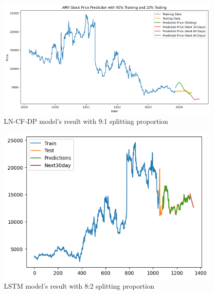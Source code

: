 \documentclass{ieeeojies}
\begin{document}
\begin{figure}[H]
  \centering
  \begin{minipage}{0.8\linewidth}
    \centering
    \includegraphics[width=\linewidth]{bibliography/Figure/AMV_LN_CF&DP.png}
    \caption{LN-CF-DP model's result with 9:1 splitting proportion}
    \label{fig8}
  \end{minipage}
\end{figure}

\begin{figure}[H]
  \centering
  \begin{minipage}{0.8\linewidth}
    \centering
    \includegraphics[width=\linewidth]{bibliography/Figure/LSTM_AMV(8_2).png}
    \caption{LSTM model's result with 8:2 splitting proportion}
    \label{fig8}
  \end{minipage}
\end{figure}
\end{document}
